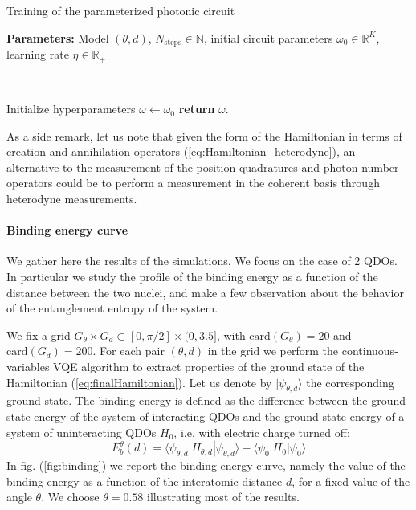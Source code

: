 \documentclass[reprint, amsmath, amssymb, floatfix, aps, pra]{revtex4-2}
\begin{document}
    \begin{algorithm}
        \caption{Training of the parameterized photonic circuit}\label{alg:training}
        \textbf{Parameters:} Model $(\theta, d)$, $N_\text{steps}\in\mathbb N$, initial circuit parameters $\omega_0\in\mathbb R^K$, learning rate $\eta\in\mathbb R_+$

        \

        Initialize hyperparameters $\omega \gets \omega_0$\;
        \textbf{return} $\omega$.
    \end{algorithm}

    As a side remark, let us note that given the form of the Hamiltonian in terms of creation and annihilation operators (\ref{eq:Hamiltonian_heterodyne}), an alternative to the measurement of the position quadratures and photon number operators could be to perform a measurement in the coherent basis through heterodyne measurements.
    \newline

\paragraph*{Binding energy curve}

    We gather here the results of the simulations. We focus on the case of 2 QDOs. In particular we study the profile of the binding energy as a function of the distance between the two nuclei, and make a few observation about the behavior of the entanglement entropy of the system.

    We fix a grid $G_\theta\times G_d\subset [0, \pi/2]\times (0, 3.5]$, with $\text{card}(G_\theta)=20$ and $\text{card}(G_d)=200$. For each pair $(\theta, d)$ in the grid we perform the continuous-variables VQE algorithm to extract properties of the ground state of the Hamiltonian (\ref{eq:finalHamiltonian}). Let us denote by $|\psi_{\theta, d}\rangle$ the corresponding ground state.
    The binding energy is defined as the difference between the ground state energy of the system of interacting QDOs and the ground state energy of a system of uninteracting QDOs $H_0$, i.e. with electric charge turned off:
    \begin{equation*}
        E^\theta_b(d) = \langle\psi_{\theta, d}|H_{\theta, d}|\psi_{\theta, d}\rangle - \langle\psi_0|H_0|\psi_0\rangle
    \end{equation*}
    In fig. (\ref{fig:binding}) we report the binding energy curve, namely the value of the binding energy as a function of the interatomic distance $d$, for a fixed value of the angle $\theta$. We choose $\theta=0.58$ illustrating most of the results.
\end{document}
